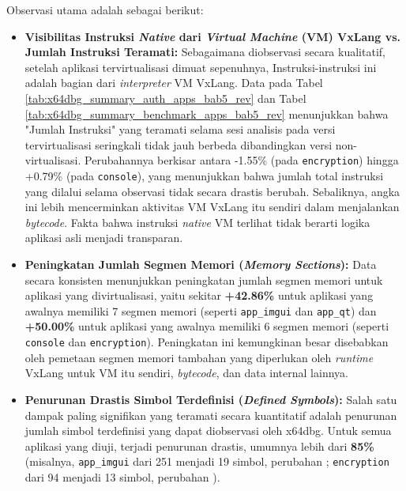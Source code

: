 Observasi utama adalah sebagai berikut:
\begin{itemize}
    \item \textbf{Visibilitas Instruksi \textit{Native} dari \textit{Virtual Machine} (VM) VxLang vs. Jumlah Instruksi Teramati:}
      Sebagaimana diobservasi secara kualitatif, setelah aplikasi tervirtualisasi dimuat sepenuhnya,  Instruksi-instruksi ini adalah bagian dari \textit{interpreter} VM VxLang. Data pada Tabel \ref{tab:x64dbg_summary_auth_apps_bab5_rev} dan Tabel \ref{tab:x64dbg_summary_benchmark_apps_bab5_rev} menunjukkan bahwa "Jumlah Instruksi" yang teramati selama sesi analisis pada versi tervirtualisasi seringkali tidak jauh berbeda dibandingkan versi non-virtualisasi. Perubahannya berkisar antara -1.55\% (pada \texttt{encryption}) hingga +0.79\% (pada \texttt{console}), yang menunjukkan bahwa jumlah total instruksi yang dilalui selama observasi tidak secara drastis berubah.
     Sebaliknya, angka ini lebih mencerminkan aktivitas VM VxLang itu sendiri dalam menjalankan \textit{bytecode}. Fakta bahwa instruksi \textit{native} VM terlihat tidak berarti logika aplikasi asli menjadi transparan.

    \item \textbf{Peningkatan Jumlah Segmen Memori (\textit{Memory Sections}):}
    Data secara konsisten menunjukkan peningkatan jumlah segmen memori untuk aplikasi yang divirtualisasi, yaitu sekitar \textbf{+42.86\%} untuk aplikasi yang awalnya memiliki 7 segmen memori (seperti \texttt{app\_imgui} dan \texttt{app\_qt}) dan \textbf{+50.00\%} untuk aplikasi yang awalnya memiliki 6 segmen memori (seperti \texttt{console} dan \texttt{encryption}). Peningkatan ini kemungkinan besar disebabkan oleh pemetaan segmen memori tambahan yang diperlukan oleh \textit{runtime} VxLang untuk VM itu sendiri, \textit{bytecode}, dan data internal lainnya.

    \item \textbf{Penurunan Drastis Simbol Terdefinisi (\textit{Defined Symbols}):}
      Salah satu dampak paling signifikan yang teramati secara kuantitatif adalah penurunan jumlah simbol terdefinisi yang dapat diobservasi oleh x64dbg. Untuk semua aplikasi yang diuji, terjadi penurunan drastis, umumnya lebih dari \textbf{85\%} (misalnya, \texttt{app\_imgui} dari 251 menjadi 19 simbol, perubahan ; \texttt{encryption} dari 94 menjadi 13 simbol, perubahan ). 


\end{itemize}
